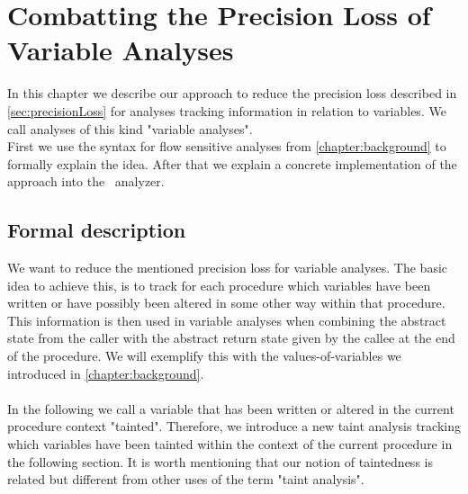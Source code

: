 
\chapter{Combatting the Precision Loss of Variable Analyses}\label{chapter:precisionLossVariableAnalyses}
  In this chapter we describe our approach to reduce the precision loss described in \autoref{sec:precisionLoss} for analyses tracking information in relation to variables. We call analyses of this kind "variable analyses".\\
  First we use the syntax for flow sensitive analyses from \autoref{chapter:background} to formally explain the idea. After that we explain a concrete implementation of the approach into the \gob\ analyzer.
  \section{Formal description}
  We want to reduce the mentioned precision loss for variable analyses. The basic idea to achieve this, is to track for each procedure which variables have been written or have possibly been altered in some other way within that procedure. This information is then used in variable analyses when combining the abstract state from the caller with the abstract return state given by the callee at the end of the procedure. We will exemplify this with the values-of-variables we introduced in \autoref{chapter:background}.\\
  \\
  In the following we call a variable that has been written or altered in the current procedure context "tainted". Therefore, we introduce a new taint analysis tracking which variables have been tainted within the context of the current procedure in the following section. It is worth mentioning that our notion of taintedness is related but different from other uses of the term "taint analysis".\\

